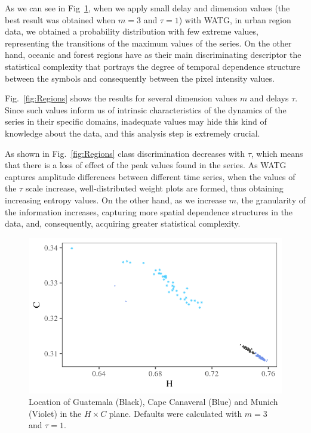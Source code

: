\documentclass{isprs}
\begin{document}
	As we can see in Fig~\ref{fig:D3T1}, when we apply small delay and dimension values (the best result was obtained when $m = 3$ and $\tau = 1$) with WATG, in urban region data, we obtained a probability distribution with few extreme values, representing the transitions of the maximum values of the series.
	On the other hand, oceanic and forest regions have as their main discriminating descriptor the statistical complexity that portrays the degree of temporal dependence structure between the symbols and consequently between the pixel intensity values.
	
	Fig.~\ref{fig:Regions} shows the results for several dimension values $m$ and delays $\tau$.
	Since such values inform us of intrinsic characteristics of the dynamics of the series in their specific domains, inadequate values may hide this kind of knowledge about the data, and this analysis step is extremely crucial.
	
	As shown in Fig.~\ref{fig:Regions} class discrimination decreases with $\tau$, which means that there is a loss of effect of the peak values found in the series.
	As WATG captures amplitude differences between different time series, when the values of the $\tau$ scale increase, well-distributed weight plots are formed, thus obtaining increasing entropy values.
	On the other hand, as we increase $m$, the granularity of the information increases, capturing more spatial dependence structures in the data, and, consequently, acquiring greater statistical complexity.
	
	\begin{figure}[hbt]
		\centering
		\includegraphics[width=0.9\columnwidth]{Figures/transitionGraphD3t1.png}
		\caption{Location of Guatemala (Black), Cape Canaveral (Blue) and Munich (Violet) in the $H \times C$ plane. Defaults were calculated with $m = 3$ and $\tau = 1$.}
		\label{fig:D3T1}
	\end{figure}
	
\end{document}
